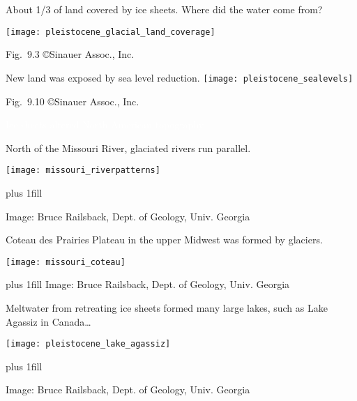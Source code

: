 \documentclass[t]{beamer}
\begin{document}
\begin{frame}{About 1/3 of land covered by ice sheets. Where did the water come from?}

	\texttt{[image: pleistocene\_glacial\_land\_coverage]}


	\vfilll
	
	\hfill \tiny Fig.~9.3 \copyright Sinauer Assoc., Inc.
	
\end{frame}

\begin{frame}{New land was exposed by sea level reduction.}
	\texttt{[image: pleistocene\_sealevels]}
	
	\vfilll
	
	\hfill \tiny Fig.~9.10 \copyright Sinauer Assoc., Inc.
	
\end{frame}


{
\begin{frame}[t]{\textcolor{white}{Ice sheets altered North American topography.}}
\end{frame}
}
\begin{frame}{North of the Missouri River, glaciated rivers run parallel.}
	\vspace{-1\baselineskip}
	\begin{center}
		\texttt{[image: missouri\_riverpatterns]}
	\end{center}

	\vskip0pt plus 1fill

	\hfill\tiny{Image: Bruce Railsback, Dept. of Geology, Univ. Georgia}
\end{frame}

\begin{frame}{Coteau des Prairies Plateau in the upper Midwest was formed by glaciers.}
		\vspace{-1\baselineskip}
		\begin{center}
			\texttt{[image: missouri\_coteau]}
		\end{center}
	\vskip0pt plus 1fill
	\hfill\tiny{Image: Bruce Railsback, Dept. of Geology, Univ. Georgia}
\end{frame}

\begin{frame}[t]{Meltwater from retreating ice sheets formed many large lakes, such as Lake Agassiz in Canada\dots}
		\vspace{-1\baselineskip}
		\begin{center}
			\texttt{[image: pleistocene\_lake\_agassiz]}
		\end{center}
	\vskip0pt plus 1fill
	
	\hfill\tiny{Image: Bruce Railsback, Dept. of Geology, Univ. Georgia}
\end{frame}
\end{document}
